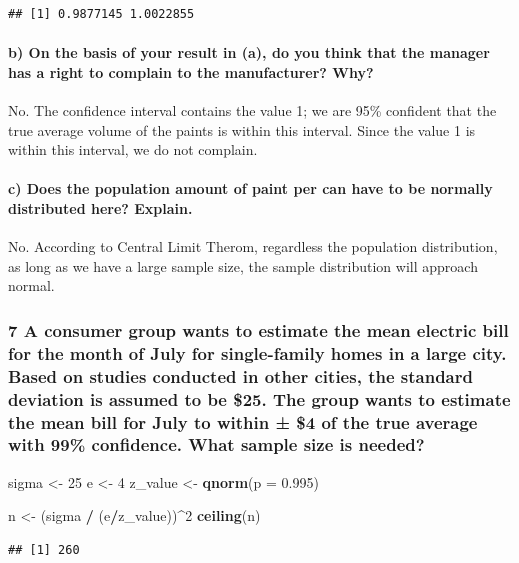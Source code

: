 \documentclass[]{article}
\newenvironment{Shaded}{\begin{snugshade}}{\end{snugshade}}
\newcommand{\KeywordTok}[1]{\textcolor[rgb]{0.13,0.29,0.53}{\textbf{#1}}}
\newcommand{\DataTypeTok}[1]{\textcolor[rgb]{0.13,0.29,0.53}{#1}}
\newcommand{\DecValTok}[1]{\textcolor[rgb]{0.00,0.00,0.81}{#1}}
\newcommand{\FloatTok}[1]{\textcolor[rgb]{0.00,0.00,0.81}{#1}}
\newcommand{\StringTok}[1]{\textcolor[rgb]{0.31,0.60,0.02}{#1}}
\newcommand{\OperatorTok}[1]{\textcolor[rgb]{0.81,0.36,0.00}{\textbf{#1}}}
\newcommand{\NormalTok}[1]{#1}
\let\oldparagraph\paragraph
\renewcommand{\paragraph}[1]{\oldparagraph{#1}\mbox{}}
\begin{document}
\begin{verbatim}
## [1] 0.9877145 1.0022855
\end{verbatim}

\paragraph{b) On the basis of your result in (a), do you think that the
manager has a right to complain to the manufacturer?
Why?}\label{b-on-the-basis-of-your-result-in-a-do-you-think-that-the-manager-has-a-right-to-complain-to-the-manufacturer-why}

No. The confidence interval contains the value 1; we are 95\% confident
that the true average volume of the paints is within this interval.
Since the value 1 is within this interval, we do not complain.

\paragraph{c) Does the population amount of paint per can have to be
normally distributed here?
Explain.}\label{c-does-the-population-amount-of-paint-per-can-have-to-be-normally-distributed-here-explain.}

No. According to Central Limit Therom, regardless the population
distribution, as long as we have a large sample size, the sample
distribution will approach normal.

\subsubsection{7 A consumer group wants to estimate the mean electric
bill for the month of July for single-family homes in a large city.
Based on studies conducted in other cities, the standard deviation is
assumed to be \$25. The group wants to estimate the mean bill for July
to within ± \$4 of the true average with 99\% confidence. What sample
size is
needed?}\label{a-consumer-group-wants-to-estimate-the-mean-electric-bill-for-the-month-of-july-for-single-family-homes-in-a-large-city.-based-on-studies-conducted-in-other-cities-the-standard-deviation-is-assumed-to-be-25.-the-group-wants-to-estimate-the-mean-bill-for-july-to-within-4-of-the-true-average-with-99-confidence.-what-sample-size-is-needed}

\begin{Shaded}
\begin{Highlighting}[]
\NormalTok{sigma <-}\StringTok{ }\DecValTok{25}
\NormalTok{e <-}\StringTok{ }\DecValTok{4}
\NormalTok{z_value <-}\StringTok{ }\KeywordTok{qnorm}\NormalTok{(}\DataTypeTok{p =} \FloatTok{0.995}\NormalTok{)}

\NormalTok{n <-}\StringTok{ }\NormalTok{(sigma }\OperatorTok{/}\StringTok{ }\NormalTok{(e}\OperatorTok{/}\NormalTok{z_value))}\OperatorTok{^}\DecValTok{2}
\KeywordTok{ceiling}\NormalTok{(n)}
\end{Highlighting}
\end{Shaded}

\begin{verbatim}
## [1] 260
\end{verbatim}
\end{document}
